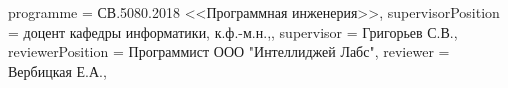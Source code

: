 \documentclass[14pt]{matmex-diploma-custom}
\theoremstyle{definition}
\begin{document}
{    %
    programme          = {СВ.5080.2018 <<Программная инженерия>>},
    supervisorPosition = {доцент кафедры информатики, к.ф.-м.н.,}, %
    supervisor         = {Григорьев С.В.},  
    reviewerPosition   = {Программист ООО "Интеллиджей Лабс"},
    reviewer           = {Вербицкая Е.А.},
}
\end{document}
